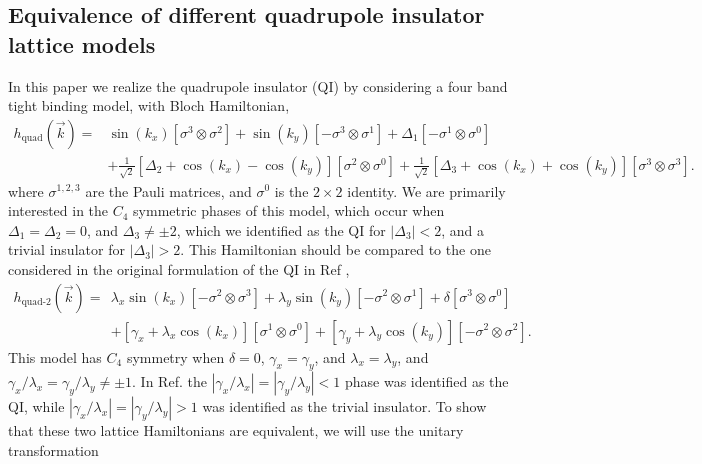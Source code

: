 \documentclass[%
 reprint,
 amsmath,amssymb,
 aps,
]{revtex4-1}
\begin{document}


\widetext
\begin{appendix}
\section{Equivalence of different quadrupole insulator lattice models}\label{app:DiffQuad}
In this paper we realize the quadrupole insulator (QI) by considering a four band tight binding model, with Bloch Hamiltonian,
\begin{equation}\begin{split}
h_{\text{quad}}(\vec{k}) = &\sin(k_x)[\sigma^3 \otimes \sigma^2]  + \sin(k_y)[-\sigma^3 \otimes \sigma^1] + \Delta_1 [-\sigma^1 \otimes \sigma^0]\\
&+\frac{1}{\sqrt{2}}[\Delta_2 + \cos(k_x)-\cos(k_y)][\sigma^2 \otimes \sigma^0]+\frac{1}{\sqrt{2}}[\Delta_3 + \cos(k_x)+\cos(k_y)][\sigma^3\otimes \sigma^3].
\label{Aeq:QILatticeModel}\end{split}\end{equation}
where $\sigma^{1,2,3}$ are the Pauli matrices, and $\sigma^0$ is the $2\times 2$ identity. We are primarily interested in the $C_4$ symmetric phases of this model, which occur when $\Delta_1 = \Delta_2 = 0$, and $\Delta_3 \neq \pm 2$, which we identified as the QI for $|\Delta_3| < 2$, and a trivial insulator for $|\Delta_3|>2$. This Hamiltonian should be compared to the one considered in the original formulation of the QI in Ref \cite{benalcazar2017quantized}, 
\begin{equation}\begin{split}
h_{\text{quad-2}}(\vec{k}) = &\lambda_x\sin(k_x)[-\sigma^2 \otimes \sigma^3]  + \lambda_y\sin(k_y)[-\sigma^2 \otimes \sigma^1] + \delta [\sigma^3 \otimes \sigma^0]\\
&+[\gamma_x + \lambda_x\cos(k_x)][\sigma^1 \otimes \sigma^0] +[\gamma_y + \lambda_y\cos(k_y)][-\sigma^2\otimes \sigma^2].
\label{Aeq:QILatticeModel2}\end{split}\end{equation}
This model has $C_4$ symmetry when $\delta = 0$, $\gamma_x = \gamma_y$, and $\lambda_x = \lambda_y$, and $\gamma_x/\lambda_x = \gamma_y/\lambda_y \neq \pm 1$. In Ref. \cite{benalcazar2017quantized} the $|\gamma_x/\lambda_x| = |\gamma_y/\lambda_y| < 1$ phase was identified as the QI, while $|\gamma_x/\lambda_x| = |\gamma_y/\lambda_y| > 1$ was identified as the trivial insulator. To show that these two lattice Hamiltonians are equivalent, we will use the unitary transformation 

\end{appendix}
\end{document}
